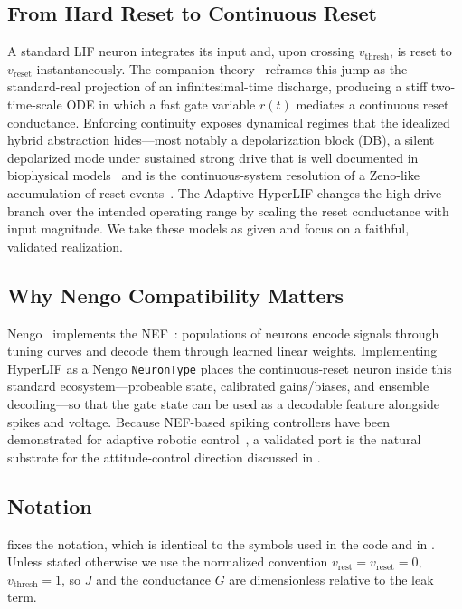 \documentclass[journal]{IEEEtran}
\newcommand{\vth}{v_{\mathrm{thresh}}}
\newcommand{\vr}{v_{\mathrm{rest}}}
\newcommand{\vre}{v_{\mathrm{reset}}}
\newcommand{\code}[1]{\texttt{#1}}
\begin{document}
\subsection{From Hard Reset to Continuous Reset}
A standard LIF neuron integrates its input and, upon crossing $\vth$, is reset
to $\vre$ instantaneously. The companion theory~\cite{hyperlif_theory} reframes
this jump as the standard-real projection of an infinitesimal-time discharge,
producing a stiff two-time-scale ODE in which a fast gate variable $r(t)$
mediates a continuous reset conductance. Enforcing continuity exposes dynamical
regimes that the idealized hybrid abstraction hides---most notably a
depolarization block (DB), a silent depolarized mode under sustained strong
drive that is well documented in biophysical
models~\cite{bianchi2012db,dovzhenok2012db} and is the continuous-system
resolution of a Zeno-like accumulation of reset events~\cite{zhang2001zeno}. The
Adaptive HyperLIF changes the high-drive branch over the intended operating range by
scaling the reset conductance with input magnitude. We take these models as
given and focus on a faithful, validated realization.

\subsection{Why Nengo Compatibility Matters}
Nengo~\cite{bekolay2014nengo} implements the NEF~\cite{eliasmith2003neural}:
populations of neurons encode signals through tuning curves and decode them
through learned linear weights. Implementing HyperLIF as a Nengo
\code{NeuronType} places the continuous-reset neuron inside this standard
ecosystem---probeable state, calibrated gains/biases, and ensemble decoding---so
that the gate state can be used as a decodable feature alongside spikes and
voltage. Because NEF-based spiking controllers have been demonstrated for
adaptive robotic control~\cite{dewolf2016reach}, a validated port is the natural
substrate for the attitude-control direction discussed in .

\subsection{Notation}
 fixes the notation, which is identical to the symbols used
in the code and in \cite{hyperlif_theory}. Unless stated otherwise we use the
normalized convention $\vr=\vre=0$, $\vth=1$, so $J$ and the conductance $G$ are
dimensionless relative to the leak term.
\end{document}
